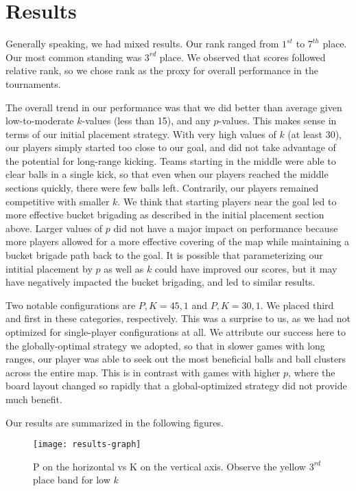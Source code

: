 \documentclass[
10pt, %
letterpaper, %
oneside, %
headinclude,footinclude, %
english
]{article}
\begin{document}
\section{Results}
Generally speaking, we had mixed results. Our rank ranged from $1^{st}$ to $7^{th}$ place. Our most common standing was $3^{rd}$ place. We observed that scores followed relative rank, so we chose rank as the proxy for overall performance in the tournaments.

The overall trend in our performance was that we did better than average given low-to-moderate $k$-values (less than 15), and any $p$-values. This makes sense in terms of our initial placement strategy. With very high values of $k$ (at least 30), our players simply started too close to our goal, and did not take advantage of the potential for long-range kicking. Teams starting in the middle were able to clear balls in a single kick, so that even when our players reached the middle sections quickly, there were few balls left. Contrarily, our players remained competitive with smaller $k$. We think that starting players near the goal led to more effective bucket brigading as described in the initial placement section above. Larger values of $p$ did not have a major impact on performance because more players allowed for a more effective covering of the map while maintaining a bucket brigade path back to the goal. It is possible that parameterizing our intitial placement by $p$ as well as $k$ could have improved our scores, but it may have negatively impacted the bucket brigading, and led to similar results.

Two notable configurations are $P,K=45,1$ and $P,K=30,1$. We placed third and first in these categories, respectively. This was a surprise to us, as we had not optimized for single-player configurations at all. We attribute our success here to the globally-optimal strategy we adopted, so that in slower games with long ranges, our player was able to seek out the most beneficial balls and ball clusters across the entire map. This is in contrast with games with higher $p$, where the board layout changed so rapidly that a global-optimized strategy did not provide much benefit.

Our results are summarized in the following figures.

\begin{figure}[h]
\centering
\texttt{[image: results-graph]}
\caption[Group 5 tournament results as a function of P and K]{P on the horizontal vs K on the vertical axis. Observe the yellow $3^{rd}$ place band for low $k$}
\label{fig:gallery2}
\end{figure}
\end{document}
